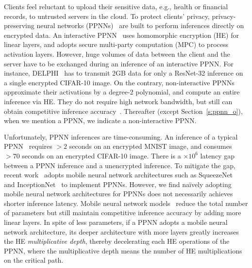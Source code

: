 \documentclass{article}
\begin{document}
Clients feel reluctant to upload their sensitive data, e.g., health or financial records, to untrusted servers in the cloud. To protect clients' privacy, privacy-preserving neural networks (PPNNs)~\cite{GAZELLE:USENIX18,mishra2020delphi,Brutzkus:ICML2019,Gilad-Bachrach:ICML2016,dathathri:2019PLDI} are built to perform inferences directly on encrypted data. An interactive PPNN~\cite{GAZELLE:USENIX18,mishra2020delphi} uses homomorphic encryption (HE) for linear layers, and adopts secure multi-party computation (MPC) to process activation layers. However, huge volumes of data between the client and the server have to be exchanged during an inference of an interactive PPNN. For instance, DELPHI~\cite{mishra2020delphi} has to transmit 2GB data for only a ResNet-32 inference on a single encrypted CIFAR-10 image. On the contrary, non-interactive PPNNs~\cite{Brutzkus:ICML2019,dathathri:2019PLDI,Dathathri:PLDI20:EVA} approximate their activations by a degree-2 polynomial, and compute an entire inference via HE. They do not require high network bandwidth, but still can obtain competitive inference accuracy~\cite{Dathathri:PLDI20:EVA}. Thereafter (except Section~\ref{s:ppnn_o}), when we mention a PPNN, we indicate a non-interactive PPNN.
	
	
Unfortunately, PPNN inferences are time-consuming. An inference of a typical PPNN~\cite{dathathri:2019PLDI} requires $>2$ seconds on an encrypted MNIST image, and consumes $>70$ seconds on an encrypted CIFAR-10 image. There is a $\times 10^6$ latency gap between a PPNN inference and a unencrypted inference. To mitigate the gap, recent work~\cite{Dathathri:PLDI20:EVA,dathathri:2019PLDI} adopts mobile neural network architectures such as SqueezeNet~\cite{iandola2016squeezenet} and InceptionNet~\cite{szegedy2016inception} to implement PPNNs. However, we find na\"ively adopting mobile neural network architectures for PPNNs does not necessarily achieves shorter inference latency. Mobile neural network models~\cite{szegedy2016inception,iandola2016squeezenet} reduce the total number of parameters but still maintain competitive inference accuracy by adding more linear layers. In spite of less parameters, if a PPNN adopts a mobile neural network architecture, its deeper architecture with more layers greatly increases the HE \textit{multiplicative depth}, thereby decelerating each HE operations of the PPNN, where the multiplicative depth means the number of HE multiplications on the critical path.




	
\end{document}
